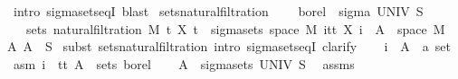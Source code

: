 \begin{isabellebody}
\ {\isacharparenleft}{\kern0pt}intro\ sigma{\isacharunderscore}{\kern0pt}sets{\isacharunderscore}{\kern0pt}eqI{\isacharparenright}{\kern0pt}\ blast{\isacharplus}{\kern0pt}%
\endisatagproof
{\isafoldproof}%
%
\isadelimproof
\isanewline
%
\endisadelimproof
\isanewline
{}\isamarkupfalse%
\ sets{\isacharunderscore}{\kern0pt}natural{\isacharunderscore}{\kern0pt}filtration{\isacharprime}{\kern0pt}{\isacharcolon}{\kern0pt}\ \isanewline
\ \ \ {\isachardoublequoteopen}borel\ {\isacharequal}{\kern0pt}\ sigma\ UNIV\ S{\isachardoublequoteclose}\isanewline
\ \ \ {\isachardoublequoteopen}sets\ {\isacharparenleft}{\kern0pt}natural{\isacharunderscore}{\kern0pt}filtration\ M\ t\ X\ t{\isacharparenright}{\kern0pt}\ {\isacharequal}{\kern0pt}\ sigma{\isacharunderscore}{\kern0pt}sets\ {\isacharparenleft}{\kern0pt}space\ M{\isacharparenright}{\kern0pt}\ {\isacharparenleft}{\kern0pt}{\isasymUnion}i{\isasymin}{\isacharbraceleft}{\kern0pt}tt{\isacharbraceright}{\kern0pt}{\isachardot}{\kern0pt}\ {\isacharbraceleft}{\kern0pt}X\ i\ {\isacharminus}{\kern0pt}{\isacharbackquote}{\kern0pt}\ A\ {\isasyminter}\ space\ M\ {\isacharbar}{\kern0pt}\ A{\isachardot}{\kern0pt}\ A\ {\isasymin}\ S{\isacharbraceright}{\kern0pt}{\isacharparenright}{\kern0pt}{\isachardoublequoteclose}\isanewline
%
\isadelimproof
%
\endisadelimproof
%
\isatagproof
{}\isamarkupfalse%
\ {\isacharparenleft}{\kern0pt}subst\ sets{\isacharunderscore}{\kern0pt}natural{\isacharunderscore}{\kern0pt}filtration{\isacharcomma}{\kern0pt}\ intro\ sigma{\isacharunderscore}{\kern0pt}sets{\isacharunderscore}{\kern0pt}eqI{\isacharcomma}{\kern0pt}\ clarify{\isacharparenright}{\kern0pt}\isanewline
\ \ \isamarkupfalse%
\ i\ \ A\ {\isacharcolon}{\kern0pt}{\isacharcolon}{\kern0pt}\ {\isachardoublequoteopen}{\isacharprime}{\kern0pt}a\ set{\isachardoublequoteclose}\ \isamarkupfalse%
\ asm{\isacharcolon}{\kern0pt}\ {\isachardoublequoteopen}i\ {\isasymin}\ {\isacharbraceleft}{\kern0pt}tt{\isacharbraceright}{\kern0pt}{\isachardoublequoteclose}\ {\isachardoublequoteopen}A\ {\isasymin}\ sets\ borel{\isachardoublequoteclose}\isanewline
\ \ \isamarkupfalse%
\ {\isachardoublequoteopen}A\ {\isasymin}\ sigma{\isacharunderscore}{\kern0pt}sets\ UNIV\ S{\isachardoublequoteclose}\ \isamarkupfalse%
\ assms\ \isamarkupfalse%

\end{isabellebody}
